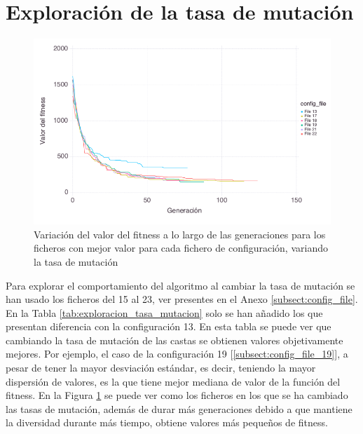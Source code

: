 \section{Exploración de la tasa de mutación}

\begin{figure}[]
	\centering	
	\includegraphics[scale=0.5]{../data/Plots/mutation_rate_executions.png}
	\caption{ Variación del valor del fitness a lo largo de las generaciones para los ficheros con mejor valor para cada fichero de configuración, variando la tasa de mutación}
    \label{fig:tasa_mutacion_variacion_generacion}
\end{figure}

Para explorar el comportamiento del algoritmo al cambiar la tasa de mutación se han usado los ficheros del 15 al 23, ver presentes en el Anexo \ref{subsect:config_file}. En la
Tabla \ref{tab:exploracion_tasa_mutacion} solo se han añadido los que presentan diferencia con la configuración 13. En esta tabla se puede ver que cambiando la tasa de mutación
de las castas se obtienen valores objetivamente mejores. Por ejemplo, el caso de la configuración 19 [\ref{subsect:config_file_19}], a pesar de tener la mayor desviación estándar,
es decir, teniendo la mayor dispersión de valores, es la que tiene mejor mediana de valor de la función del fitness. En la Figura \ref{fig:tasa_mutacion_variacion_generacion} se puede 
ver como los ficheros en los que se ha cambiado las tasas de mutación, además de durar más generaciones debido a que mantiene la diversidad durante más tiempo, obtiene
valores más pequeños de fitness.



